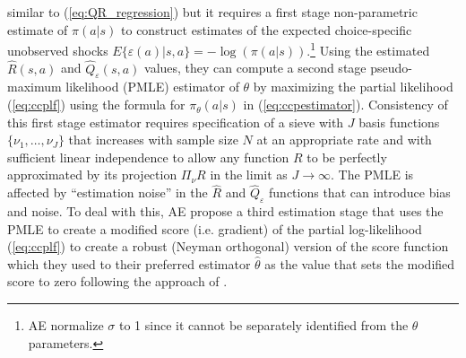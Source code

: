 similar to (\ref{eq:QR_regression}) but it requires a first stage non-parametric estimate of $\pi(a|s)$ to construct
estimates of the expected choice-specific unobserved shocks $E\{\varepsilon(a)|s,a\}=-\log(\pi(a|s))$.\footnote{\footnotesize 
AE normalize  $\sigma$ to 1 since it cannot be separately identified from the $\theta$ parameters.}
Using the estimated $\hat R(s,a)$ and $\hat Q_{\varepsilon}(s,a)$ values, 
 they can compute a second stage pseudo-maximum likelihood (PMLE) estimator of $\theta$ by maximizing 
the partial likelihood (\ref{eq:ccplf})  using the formula for $\pi_\theta(a|s)$ in (\ref{eq:ccpestimator}). Consistency
of this first stage estimator requires specification of a sieve with $J$ basis functions $\{\nu_1,\ldots,\nu_J\}$ that increases with
sample size $N$ at an appropriate rate and with sufficient linear independence
to allow any function $R$ to be perfectly approximated by its projection $\Pi_\nu R$ in the limit as $J \to \infty$. 
The PMLE is affected by ``estimation noise'' in the $\hat R$ and $\hat Q_{\varepsilon}$ functions
that can introduce bias and noise. To deal with this, AE propose a third estimation stage that uses the PMLE
to create a modified  score (i.e. gradient) of the  partial log-likelihood (\ref{eq:ccplf}) to create 
a robust (Neyman orthogonal) version of the score function
which they used to their preferred estimator $\hat\theta$  as the value that sets the modified score to zero following the
approach of \citet{lrspe:2022}. 

